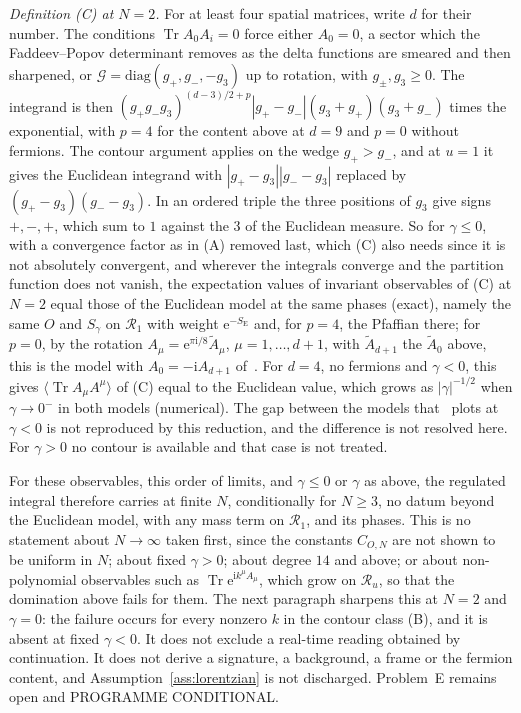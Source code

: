 \emph{Definition (C) at \(N=2\).} For at least four spatial matrices, write \(d\) for their number. The conditions \(\operatorname{Tr}A_0A_i=0\) force either \(A_0=0\), a sector which the Faddeev--Popov determinant removes as the delta functions are smeared and then sharpened, or \(\mathcal G=\mathrm{diag}(g_+,g_-,-g_3)\) up to rotation, with \(g_\pm,g_3\ge0\). The integrand is then \((g_+g_-g_3)^{(d-3)/2+p}|g_+-g_-|(g_3+g_+)(g_3+g_-)\) times the exponential, with \(p=4\) for the content above at \(d=9\) and \(p=0\) without fermions. The contour argument applies on the wedge \(g_+>g_-\), and at \(u=1\) it gives the Euclidean integrand with \(|g_+-g_3||g_--g_3|\) replaced by \((g_+-g_3)(g_--g_3)\). In an ordered triple the three positions of \(g_3\) give signs \(+,-,+\), which sum to \(1\) against the \(3\) of the Euclidean measure. So for \(\gamma\le0\), with a convergence factor as in (A) removed last, which (C) also needs since it is not absolutely convergent, and wherever the integrals converge and the partition function does not vanish, the expectation values of invariant observables of (C) at \(N=2\) equal those of the Euclidean model at the same phases (exact), namely the same \(O\) and \(S_\gamma\) on \(\mathcal R_1\) with weight \(\mathrm e^{-S_{\mathrm E}}\) and, for \(p=4\), the Pfaffian there; for \(p=0\), by the rotation \(A_\mu=\mathrm e^{\pi\mathrm i/8}\tilde A_\mu\), \(\mu=1,\dots,d+1\), with \(\tilde A_{d+1}\) the \(\tilde A_0\) above, this is the model with \(A_0=-\mathrm iA_{d+1}\) of~\cite{ChouNishimuraTripathi2025}. For \(d=4\), no fermions and \(\gamma<0\), this gives \(\langle\operatorname{Tr}A_\mu A^\mu\rangle\) of (C) equal to the Euclidean value, which grows as \(|\gamma|^{-1/2}\) when \(\gamma\to0^-\) in both models (numerical). The gap between the models that~\cite{ChouNishimuraTripathi2025} plots at \(\gamma<0\) is not reproduced by this reduction, and the difference is not resolved here. For \(\gamma>0\) no contour is available and that case is not treated.

For these observables, this order of limits, and \(\gamma\le0\) or \(\gamma\) as above, the regulated integral therefore carries at finite \(N\), conditionally for \(N\ge3\), no datum beyond the Euclidean model, with any mass term on \(\mathcal R_1\), and its phases. This is no statement about \(N\to\infty\) taken first, since the constants \(C_{O,N}\) are not shown to be uniform in \(N\); about fixed \(\gamma>0\); about degree \(14\) and above; or about non-polynomial observables such as \(\operatorname{Tr}\mathrm e^{\mathrm ik^\mu A_\mu}\), which grow on \(\mathcal R_u\), so that the domination above fails for them. The next paragraph sharpens this at \(N=2\) and \(\gamma=0\): the failure occurs for every nonzero \(k\) in the contour class (B), and it is absent at fixed \(\gamma<0\). It does not exclude a real-time reading obtained by continuation. It does not derive a signature, a background, a frame or the fermion content, and Assumption~\ref{ass:lorentzian} is not discharged. Problem~E remains open and PROGRAMME CONDITIONAL.

